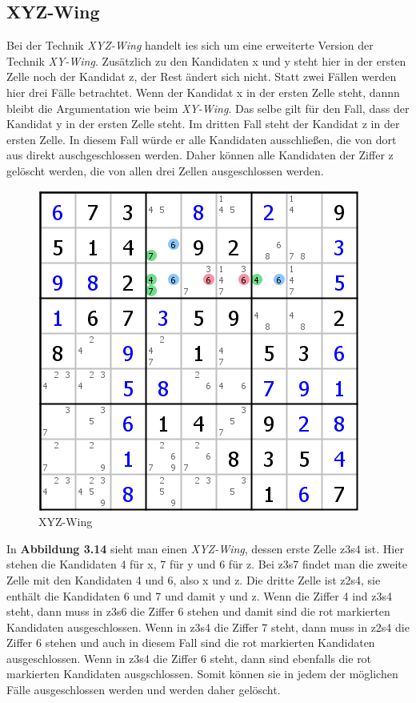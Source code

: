\newpage
\subsection{XYZ-Wing}
Bei der Technik \textit{XYZ-Wing} handelt ies sich um eine erweiterte Version der Technik \textit{XY-Wing}. Zusätzlich zu den Kandidaten x und y steht hier in der ersten Zelle noch der Kandidat z, der Rest ändert sich nicht. Statt zwei Fällen werden hier drei Fälle betrachtet. Wenn der Kandidat x in der ersten Zelle steht, dannn bleibt die Argumentation wie beim \textit{XY-Wing}. Das selbe gilt für den Fall, dass der Kandidat y in der ersten Zelle steht. Im dritten Fall steht der Kandidat z in der ersten Zelle. In diesem Fall würde er alle Kandidaten ausschließen, die von dort aus direkt auschgeschlossen werden. Daher können alle Kandidaten der Ziffer z gelöscht werden, die von allen drei Zellen ausgeschlossen werden.

\begin{figure}[h]
\begin{center}
\includegraphics{./img/XYZ_Wing.png}
\caption{XYZ-Wing}
\end{center}
\end{figure}

In \textbf{Abbildung 3.14} sieht man einen \textit{XYZ-Wing}, dessen erste Zelle z3s4 ist. Hier stehen die Kandidaten 4 für x, 7 für y und 6 für z. Bei z3s7 findet man die zweite Zelle mit den Kandidaten 4 und 6, also x und z. Die dritte Zelle ist z2s4, sie enthält die Kandidaten 6 und 7 und damit y und z. Wenn die Ziffer 4 ind z3s4 steht, dann muss in z3s6 die Ziffer 6 stehen und damit sind die rot markierten Kandidaten ausgeschlossen. Wenn in z3s4 die Ziffer 7 steht, dann muss in z2s4 die Ziffer 6 stehen und auch in diesem Fall sind die rot markierten Kandidaten ausgeschlossen. Wenn in z3s4 die Ziffer 6 steht, dann sind ebenfalls die rot markierten Kandidaten ausgschlossen. Somit können sie in jedem der möglichen Fälle ausgeschlossen werden und werden daher gelöscht.